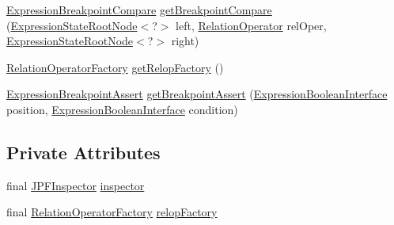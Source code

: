 \begin{DoxyCompactItemize}
\item 
\hyperlink{classgov_1_1nasa_1_1jpf_1_1inspector_1_1server_1_1expression_1_1expressions_1_1_expression_breakpoint_compare}{Expression\+Breakpoint\+Compare} \hyperlink{classgov_1_1nasa_1_1jpf_1_1inspector_1_1server_1_1expression_1_1_expression_factory_a3638c08d083b76cd106213160815a0e1}{get\+Breakpoint\+Compare} (\hyperlink{interfacegov_1_1nasa_1_1jpf_1_1inspector_1_1server_1_1expression_1_1_expression_state_root_node}{Expression\+State\+Root\+Node}$<$?$>$ left, \hyperlink{interfacegov_1_1nasa_1_1jpf_1_1inspector_1_1server_1_1programstate_1_1relop_1_1_relation_operator}{Relation\+Operator} rel\+Oper, \hyperlink{interfacegov_1_1nasa_1_1jpf_1_1inspector_1_1server_1_1expression_1_1_expression_state_root_node}{Expression\+State\+Root\+Node}$<$?$>$ right)
\item 
\hyperlink{classgov_1_1nasa_1_1jpf_1_1inspector_1_1server_1_1programstate_1_1relop_1_1_relation_operator_factory}{Relation\+Operator\+Factory} \hyperlink{classgov_1_1nasa_1_1jpf_1_1inspector_1_1server_1_1expression_1_1_expression_factory_a0928766be505dcdbff70bbd84d060a66}{get\+Relop\+Factory} ()
\item 
\hyperlink{classgov_1_1nasa_1_1jpf_1_1inspector_1_1server_1_1expression_1_1expressions_1_1_expression_breakpoint_assert}{Expression\+Breakpoint\+Assert} \hyperlink{classgov_1_1nasa_1_1jpf_1_1inspector_1_1server_1_1expression_1_1_expression_factory_a2400863e60747a98d6598cd773fba50a}{get\+Breakpoint\+Assert} (\hyperlink{interfacegov_1_1nasa_1_1jpf_1_1inspector_1_1server_1_1expression_1_1_expression_boolean_interface}{Expression\+Boolean\+Interface} position, \hyperlink{interfacegov_1_1nasa_1_1jpf_1_1inspector_1_1server_1_1expression_1_1_expression_boolean_interface}{Expression\+Boolean\+Interface} condition)
\end{DoxyCompactItemize}
\subsection*{Private Attributes}
\begin{DoxyCompactItemize}
\item 
final \hyperlink{classgov_1_1nasa_1_1jpf_1_1inspector_1_1server_1_1jpf_1_1_j_p_f_inspector}{J\+P\+F\+Inspector} \hyperlink{classgov_1_1nasa_1_1jpf_1_1inspector_1_1server_1_1expression_1_1_expression_factory_a3a9c2a8f91b31b8105ed93e509fab8ca}{inspector}
\item 
final \hyperlink{classgov_1_1nasa_1_1jpf_1_1inspector_1_1server_1_1programstate_1_1relop_1_1_relation_operator_factory}{Relation\+Operator\+Factory} \hyperlink{classgov_1_1nasa_1_1jpf_1_1inspector_1_1server_1_1expression_1_1_expression_factory_a04112c5f8901f1f283af395fd7782326}{relop\+Factory}
\end{DoxyCompactItemize}


